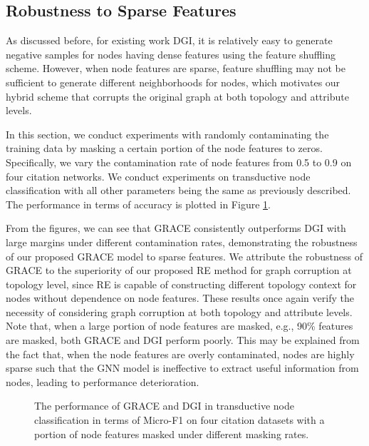 \documentclass{article}
\theoremstyle{remark}
\begin{document}
\subsection{Robustness to Sparse Features}
\label{appendix:robustness}

As discussed before, for existing work DGI, it is relatively easy to generate negative samples for nodes having dense features using the feature shuffling scheme. However, when node features are sparse, feature shuffling may not be sufficient to generate different neighborhoods for nodes, which motivates our hybrid scheme that corrupts the original graph at both topology and attribute levels. 


In this section, we conduct experiments with randomly contaminating the training data by masking a certain portion of the node features to zeros. Specifically, we vary the contamination rate of node features from 0.5 to 0.9 on four citation networks. We conduct experiments on transductive node classification with all other parameters being the same as previously described. The performance in terms of accuracy is plotted in Figure \ref{fig:robustness}.

From the figures, we can see that GRACE consistently outperforms DGI with large margins under different contamination rates, demonstrating the robustness of our proposed GRACE model to sparse features.
We attribute the robustness of GRACE to the superiority of our proposed RE method for graph corruption at topology level, since RE is capable of constructing different topology context for nodes without dependence on node features.
These results once again verify the necessity of considering graph corruption at both topology and attribute levels.
Note that, when a large portion of node features are masked, e.g., 90\% features are masked, both GRACE and DGI perform poorly. This may be explained from the fact that, when the node features are overly contaminated, nodes are highly sparse such that the GNN model is ineffective to extract useful information from nodes, leading to performance deterioration. 

\begin{figure}[h]
	\centering
	\caption{The performance of GRACE and DGI in transductive node classification in terms of Micro-F1 on four citation datasets with a portion of node features masked under different masking rates.}
	\label{fig:robustness}
\end{figure}
\end{document}
